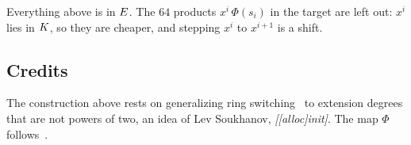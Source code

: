 Everything above is in $E$. The $64$ products $x^i\,\Phi(s_i)$ in the target are left out: $x^i$ lies in $K$, so they are cheaper, and stepping $x^i$ to $x^{i+1}$ is a shift.

\subsection{Credits}\label{rs:credits}

The construction above rests on generalizing ring switching~\cite{DP26} to extension degrees that are not powers of two, an idea of Lev Soukhanov, \textit{[[alloc]init]}. The map $\Phi$ follows~\cite{Flock26}.
